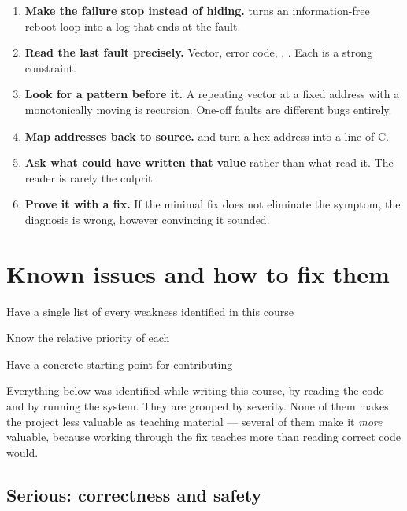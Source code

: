 \begin{enumerate}
  \item \textbf{Make the failure stop instead of hiding.}  turns an
        information-free reboot loop into a log that ends at the fault.
  \item \textbf{Read the last fault precisely.} Vector, error code, , . Each is a
        strong constraint.
  \item \textbf{Look for a pattern before it.} A repeating vector at a fixed address with a
        monotonically moving  is recursion. One-off faults are different bugs entirely.
  \item \textbf{Map addresses back to source.}  and  turn a hex address into a
        line of C.
  \item \textbf{Ask what could have written that value} rather than what read it. The reader is
        rarely the culprit.
  \item \textbf{Prove it with a fix.} If the minimal fix does not eliminate the symptom, the
        diagnosis is wrong, however convincing it sounded.
\end{enumerate}

\chapter{Known issues and how to fix them}

\begin{goals}
  \item Have a single list of every weakness identified in this course
  \item Know the relative priority of each
  \item Have a concrete starting point for contributing
\end{goals}

Everything below was identified while writing this course, by reading the code and by running the
system. They are grouped by severity. None of them makes the project less valuable as teaching
material --- several of them make it \emph{more} valuable, because working through the fix teaches
more than reading correct code would.

\section{Serious: correctness and safety}

